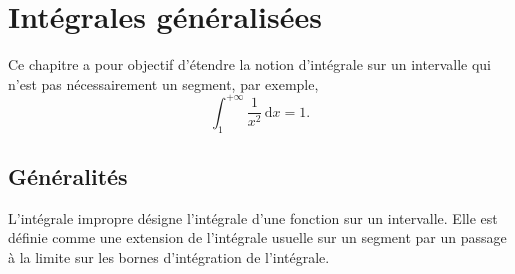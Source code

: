 \documentclass{book}
\begin{document}
\chapter*{Intégrales généralisées}
Ce chapitre a pour objectif d'étendre la notion d'intégrale sur un intervalle qui n'est pas nécessairement un
segment, par exemple, $$\int_{1 }^{+\infty } \frac{1}{x^2} \,\mathrm dx = 1.$$
\begin{center}
\end{center}
\section{Généralités}
L'intégrale impropre désigne l'intégrale d'une fonction sur un intervalle. Elle est définie comme une extension de l'intégrale usuelle sur un segment  par un passage à la limite sur les bornes d'intégration de l'intégrale.   
\end{document}
